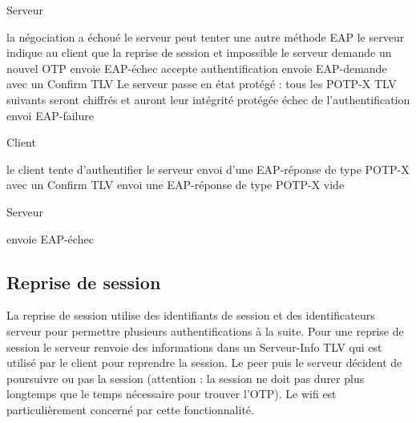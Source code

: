 \documentclass{../res/univ-projet}
\begin{document}
\begin{flushleft}
\begin{algorithm}[!h]
	\caption{Serveur}
	\label{POTP:verif}
\begin{algorithmic}
	\STATE la négociation a échoué
	\STATE le serveur peut tenter une autre méthode EAP
\ENDIF
{}
	\STATE le serveur indique au client que la reprise de session et impossible
	\STATE le serveur demande un nouvel OTP
\ENDIF
{}
	\STATE envoie EAP-échec
\ENDIF
{}
	\STATE accepte authentification
	\STATE envoie EAP-demande avec un Confirm TLV
		\STATE Le serveur passe en état protégé : tous les POTP-X TLV suivants seront chiffrés et auront leur intégrité protégée
	\ENDIF
\ELSE
	\STATE échec de l'authentification
	\STATE envoi EAP-failure
\ENDIF

\end{algorithmic}
\end{algorithm}
\end{flushleft}



\begin{flushright}
\begin{algorithm}[!h]
	\caption{Client}
	\label{POTP:verif}
\begin{algorithmic}
	\STATE le client tente d'authentifier le serveur
		\STATE envoi d'une EAP-réponse de type POTP-X avec un Confirm TLV
	\ELSE
		\STATE envoi une EAP-réponse de type POTP-X vide
	\ENDIF
\ENDIF

\end{algorithmic}
\end{algorithm}
\end{flushright}


\begin{flushleft}
\begin{algorithm}[!h]
	\caption{Serveur}
	\label{POTP:verif}
\begin{algorithmic}
	\STATE envoie EAP-échec
\ENDIF

\end{algorithmic}
\end{algorithm}
\end{flushleft}


\subsection{Reprise de session}
La reprise de session utilise des identifiants de session et des identificateurs serveur pour permettre plusieurs authentifications à la suite.
Pour une reprise de session le serveur renvoie des informations dans un Serveur-Info TLV qui est utilisé par le client pour reprendre la session.
Le peer puis le serveur décident de poursuivre ou pas la session (attention : la session ne doit pas durer plus longtemps que le temps nécessaire pour trouver l'OTP).
Le wifi est particulièrement concerné par cette fonctionnalité.
\end{document}
